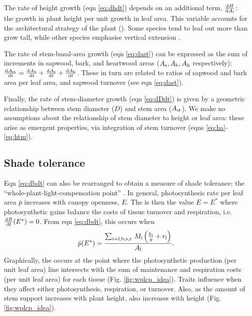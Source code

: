 \documentclass[9pt,twocolumn,twoside,lineno]{pnas-new}
\begin{document}
The rate of height growth (eqn \ref{eq:dhdt}) depends on an additional term, $\frac{{\rm d}H }{{\rm d}A_{\rm l}}$: the growth in plant height per unit growth in leaf area. This variable accounts for the architectural strategy of the plant (\citep{Falster-2011}). Some species tend to leaf out more than grow tall, while other species emphasise vertical extension \citep{Poorter-2006}.

The rate of stem-basal-area growth (eqn \ref{eq:dast}) can be expressed as the sum of increments in sapwood, bark, and heartwood areas ($A_{\rm s}, A_{\rm b}, A_{\rm h}$ respectively): $\frac{{\rm d}A_{\rm st}}{{\rm d}t}= \frac{{\rm d}A_{\rm b}}{{\rm d}t} + \frac{{\rm d}A_{\rm s}}{{\rm d}t} + \frac{{\rm d}A_{\rm h}}{{\rm d}t}$. These in turn are related to ratios of sapwood and bark area per leaf area, and sapwood turnover (see eqn \ref{eq:dast}).

Finally, the rate of stem-diameter growth (eqn \ref{eq:dDdt}) is given by a geometric relationship between stem diameter ($D$) and stem area ($A_{\rm st}$). We make no assumptions about the relationship of stem diameter to height or leaf area: these arise as emergent properties, via integration of stem turnover (eqns \ref{eq:ha}-\ref{eq:htm}).



\subsection{Shade tolerance}

Eqn \ref{eq:dbdt} can also be rearranged to obtain a measure of shade tolerance: the ``whole-plant-light-compensation point'' \citep[{\wplcp}][]{Givnish-1988, Baltzer-2007, Lusk-2013} . In general, photosynthesis rate per leaf area $\bar{p}$ increases with canopy openness, $E$. The {\wplcp} is then the value $E=E^*$ where photosynthetic gains balance the costs of tissue turnover and respiration, i.e. $\frac{{\rm d}B}{{\rm d}t}(E^*)=0$. From eqn \ref{eq:dbdt}, this occurs when
\begin{equation}\label{eq:wplcp}
\bar{p}(E^*) =\frac{\sum_{i={\rm l,b,s,r}} \, M_{\rm i} \left(\frac{k_{\rm i}}{y} + r_{\rm i}\right)}{A_{\rm l}}.
\end{equation}
Graphically, the {\wplcp} occurs at the point where the photosynthetic production (per unit leaf area) line intersects with the sum of maintenance and respiration costs (per unit leaf area) for each tissue (Fig. \ref{fig:wplcp_idea}). Traits influence {\wplcp} when they affect either photosynthesis, respiration, or turnover. Also, as the amount of stem support increases with plant height, {\wplcp} also increases with height \citep{Givnish-1988} (Fig. \ref{fig:wplcp_idea}).
\end{document}

